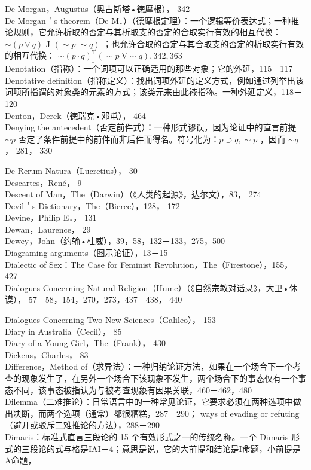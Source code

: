 De Morgan，Augustus（奥古斯塔•徳摩根）， 342\\
De Morgan＇s theorem（De M．）（德摩根定理）：一个逻辑等价表达式；一种推论规则，它允许析取的否定与其析取支的否定的合取实行有效的相互代换：$\sim(p \vee q)$ J $(\sim p \cdot \sim q)$ ；也允许合取的否定与其合取支的否定的析取实行有效的相互代换： $\sim(p \cdot q)_{\mathrm{I}}^{\mathrm{T}}(\sim p \mathrm{~V} \sim q), 342,363$\\
Denotation（指称）：一个词项可以正确适用的那些对象；它的外延，115－117\\
Denotative definition（指称定义）：找出词项外延的定义方式，例如通过列举出该词项所指谓的对象类的元素的方式；该类元来由此䘸指称。一种外延定义，118－120\\
Denton，Derek（徳瑞克•邓屯）， 464\\
Denying the antecedent（否定前件式）：一种形式谬误，因为论证中的直言前提 $\sim p$ 否定了条件前提中的前件而非后件而得名。符号化为：$p \supset q, \sim p$ ，因而 $\sim q$ ， 281， 330

De Rerum Natura（Lucretius）， 30\\
Descartes，René， 9\\
Descent of Man，The（Darwin）（《人类的起源》，达尔文），83， 274\\
Devil＇s Dictionary，The（Bierce），128， 172\\
Devine，Philip E．， 131\\
Dewan，Laurence， 29\\
Dewey，John（约输•杜威），39，58，132－133，275，500\\
Diagraming arguments（图示论证），13－15\\
Dialectic of Sex：The Case for Feminist Revolution，The（Firestone），155， 427\\
Dialogues Concerning Natural Religion（Hume）（《自然宗教对话录》，大卫•休谟）， 57－58，154，270，273，437－438， 440

Dialogues Concerning Two New Sciences（Galileo）， 153\\
Diary in Australia（Cecil）， 85\\
Diary of a Young Girl，The（Frank）， 430\\
Dickens，Charles， 83\\
Difference，Method of（求异法）：一种归纳论证方法，如果在一个场合下一个考查的现象发生了，在另外一个场合下该现象不发生，两个场合下的事态仅有一个事态不同，该事态被指认为与被考查现象有因果关联，460－462，480\\
Dilemma（二难推论）：日常语言中的一种常见论证，它要求必须在两种选项中做出决断，而两个选项（通常）都很糟糕，287－290； ways of evading or refuting（避开或驳斥二难推论的方法），288－290\\
Dimaris：标准式直言三段论的 15 个有效形式之一的传统名称。一个 Dimaris 形式的三段论的式与格是IAI－4；意思是说，它的大前提和结论是I命题，小前提是A命题，

